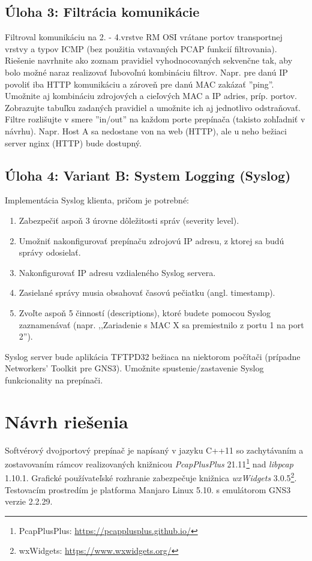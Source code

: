 \documentclass[12pt, a4paper]{article}
\begin{document}
\subsection{Úloha 3: Filtrácia komunikácie}
Filtroval komunikáciu na 2. - 4.vrstve  RM  OSI  vrátane portov  transportnej  vrstvy  a  typov  ICMP  (bez  použitia 
vstavaných  PCAP funkcií filtrovania). Riešenie navrhnite  ako  zoznam  pravidiel  vyhodnocovaných sekvenčne tak, 
aby bolo možné naraz realizovať ľubovoľnú kombináciu filtrov. Napr. pre danú IP povoliť iba HTTP komunikáciu a 
zároveň pre danú MAC zakázať ''ping''. Umožnite aj kombináciu  zdrojových a cieľových MAC a IP  adries, príp. 
portov. Zobrazujte tabuľku zadaných pravidiel a umožnite ich aj jednotlivo odstraňovať. Filtre rozlišujte v smere 
''in/out'' na každom porte prepínača (takisto zohľadniť v návrhu). Napr. Host A sa nedostane von na web (HTTP), 
ale u neho bežiaci server nginx (HTTP) bude dostupný. 

\subsection{Úloha 4: Variant B: System Logging (Syslog)}
Implementácia Syslog klienta, pričom je potrebné:
\begin{enumerate}
\setlength\itemsep{0em}
\item Zabezpečiť aspoň 3 úrovne dôležitosti správ (severity level).
\item Umožniť nakonfigurovať prepínaču zdrojovú IP adresu, z ktorej sa budú správy odosielať. 
\item Nakonfigurovať IP adresu vzdialeného Syslog servera.
\item Zasielané správy musia obsahovať časovú pečiatku (angl. timestamp).
\item Zvoľte aspoň 5 činností  (descriptions), ktoré budete pomocou Syslog zaznamenávať (napr. ,,Zariadenie s 
MAC X sa premiestnilo z portu 1 na port 2'').
\end{enumerate} 
Syslog server bude aplikácia TFTPD32 bežiaca na niektorom počítači  (prípadne Networkers' Toolkit pre GNS3). 
Umožnite spustenie/zastavenie Syslog funkcionality na prepínači.

\section{Návrh riešenia}
Softvérový dvojportový prepínač je napísaný v jazyku C++11 so zachytávaním a zostavovaním rámcov realizovaných knižnicou \textit{PcapPlusPlus} 21.11\footnote{PcapPlusPlus: \url{https://pcapplusplus.github.io/}} nad \textit{libpcap} 1.10.1. Grafické používateľské rozhranie zabezpečuje knižnica \textit{wxWidgets} 3.0.5\footnote{wxWidgets: \url{https://www.wxwidgets.org/}}.
Testovacím prostredím je platforma Manjaro Linux 5.10. s emulátorom GNS3 verzie 2.2.29.
\end{document}
